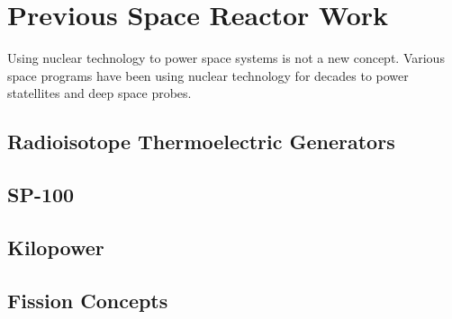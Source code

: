 \section{Previous Space Reactor Work}
Using nuclear technology to power space systems is not a new concept. Various
space programs have been using nuclear technology for decades to power
statellites and deep space probes.

\subsection{Radioisotope Thermoelectric Generators}

\subsection{SP-100}

\subsection{Kilopower}

\subsection{Fission Concepts}
